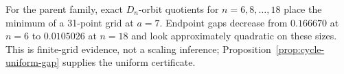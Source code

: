 



For the parent family, exact $D_n$-orbit quotients for
$n=6,8,\ldots,18$ place the minimum of a 31-point grid at $a=7$.  Endpoint
gaps decrease from $0.166670$ at $n=6$ to $0.0105026$ at $n=18$ and look
approximately quadratic on these sizes.  This is finite-grid evidence, not
a scaling inference; Proposition~\ref{prop:cycle-uniform-gap} supplies the
uniform certificate.
